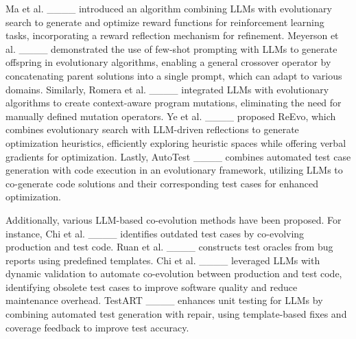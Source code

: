 Ma et al. ____ introduced an algorithm combining LLMs with evolutionary search to generate and optimize reward functions for reinforcement learning tasks, incorporating a reward reflection mechanism for refinement. 
Meyerson et al. ____ demonstrated the use of few-shot prompting with LLMs to generate offspring in evolutionary algorithms, enabling a general crossover operator by concatenating parent solutions into a single prompt, which can adapt to various domains.
Similarly, Romera et al. ____ integrated LLMs with evolutionary algorithms to create context-aware program mutations, eliminating the need for manually defined mutation operators. 
Ye et al. ____ proposed ReEvo, which combines evolutionary search with LLM-driven reflections to generate optimization heuristics, efficiently exploring heuristic spaces while offering verbal gradients for optimization. 
Lastly, AutoTest ____ combines automated test case generation with code execution in an evolutionary framework, utilizing LLMs to co-generate code solutions and their corresponding test cases for enhanced optimization.

Additionally, various LLM-based co-evolution methods have been proposed. 
For instance,
Chi et al. ____ identifies outdated test cases by co-evolving production and test code.
Ruan et al. ____ constructs test oracles from bug reports using predefined templates.
Chi et al. ____ leveraged LLMs with dynamic validation to automate co-evolution between production and test code, identifying obsolete test cases to improve software quality and reduce maintenance overhead.
TestART ____ enhances unit testing for LLMs by combining automated test generation with repair, using template-based fixes and coverage feedback to improve test accuracy.